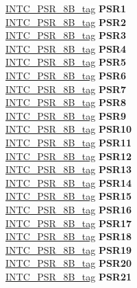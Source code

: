 \begin{DoxyCompactItemize}
\begin{tabbing}
\>\>\mbox{\hyperlink{unionINTC__PSR__8B__tag}{INTC\_PSR\_8B\_tag}} {\bfseries PSR1}\\
\>\>\mbox{\hyperlink{unionINTC__PSR__8B__tag}{INTC\_PSR\_8B\_tag}} {\bfseries PSR2}\\
\>\>\mbox{\hyperlink{unionINTC__PSR__8B__tag}{INTC\_PSR\_8B\_tag}} {\bfseries PSR3}\\
\>\>\mbox{\hyperlink{unionINTC__PSR__8B__tag}{INTC\_PSR\_8B\_tag}} {\bfseries PSR4}\\
\>\>\mbox{\hyperlink{unionINTC__PSR__8B__tag}{INTC\_PSR\_8B\_tag}} {\bfseries PSR5}\\
\>\>\mbox{\hyperlink{unionINTC__PSR__8B__tag}{INTC\_PSR\_8B\_tag}} {\bfseries PSR6}\\
\>\>\mbox{\hyperlink{unionINTC__PSR__8B__tag}{INTC\_PSR\_8B\_tag}} {\bfseries PSR7}\\
\>\>\mbox{\hyperlink{unionINTC__PSR__8B__tag}{INTC\_PSR\_8B\_tag}} {\bfseries PSR8}\\
\>\>\mbox{\hyperlink{unionINTC__PSR__8B__tag}{INTC\_PSR\_8B\_tag}} {\bfseries PSR9}\\
\>\>\mbox{\hyperlink{unionINTC__PSR__8B__tag}{INTC\_PSR\_8B\_tag}} {\bfseries PSR10}\\
\>\>\mbox{\hyperlink{unionINTC__PSR__8B__tag}{INTC\_PSR\_8B\_tag}} {\bfseries PSR11}\\
\>\>\mbox{\hyperlink{unionINTC__PSR__8B__tag}{INTC\_PSR\_8B\_tag}} {\bfseries PSR12}\\
\>\>\mbox{\hyperlink{unionINTC__PSR__8B__tag}{INTC\_PSR\_8B\_tag}} {\bfseries PSR13}\\
\>\>\mbox{\hyperlink{unionINTC__PSR__8B__tag}{INTC\_PSR\_8B\_tag}} {\bfseries PSR14}\\
\>\>\mbox{\hyperlink{unionINTC__PSR__8B__tag}{INTC\_PSR\_8B\_tag}} {\bfseries PSR15}\\
\>\>\mbox{\hyperlink{unionINTC__PSR__8B__tag}{INTC\_PSR\_8B\_tag}} {\bfseries PSR16}\\
\>\>\mbox{\hyperlink{unionINTC__PSR__8B__tag}{INTC\_PSR\_8B\_tag}} {\bfseries PSR17}\\
\>\>\mbox{\hyperlink{unionINTC__PSR__8B__tag}{INTC\_PSR\_8B\_tag}} {\bfseries PSR18}\\
\>\>\mbox{\hyperlink{unionINTC__PSR__8B__tag}{INTC\_PSR\_8B\_tag}} {\bfseries PSR19}\\
\>\>\mbox{\hyperlink{unionINTC__PSR__8B__tag}{INTC\_PSR\_8B\_tag}} {\bfseries PSR20}\\
\>\>\mbox{\hyperlink{unionINTC__PSR__8B__tag}{INTC\_PSR\_8B\_tag}} {\bfseries PSR21}\\

\end{tabbing}
\end{DoxyCompactItemize}
